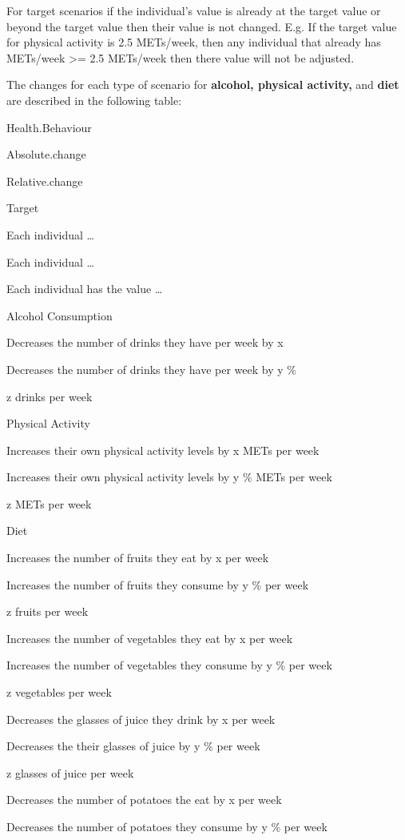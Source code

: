 \documentclass[]{book}
\begin{document}
For target scenarios if the individual's value is already at the target
value or beyond the target value then their value is not changed. E.g.
If the target value for physical activity is 2.5 METs/week, then any
individual that already has METs/week \textgreater{}= 2.5 METs/week then
there value will not be adjusted.

The changes for each type of scenario for \textbf{alcohol, physical
activity,} and \textbf{diet} are described in the following table:

Health.Behaviour

Absolute.change

Relative.change

Target

Each individual \ldots{}

Each individual \ldots{}

Each individual has the value \ldots{}

Alcohol Consumption

Decreases the number of drinks they have per week by x

Decreases the number of drinks they have per week by y \%

z drinks per week

Physical Activity

Increases their own physical activity levels by x METs per week

Increases their own physical activity levels by y \% METs per week

z METs per week

Diet

Increases the number of fruits they eat by x per week

Increases the number of fruits they consume by y \% per week

z fruits per week

Increases the number of vegetables they eat by x per week

Increases the number of vegetables they consume by y \% per week

z vegetables per week

Decreases the glasses of juice they drink by x per week

Decreases the their glasses of juice by y \% per week

z glasses of juice per week

Decreases the number of potatoes the eat by x per week

Decreases the number of potatoes they consume by y \% per week
\end{document}
